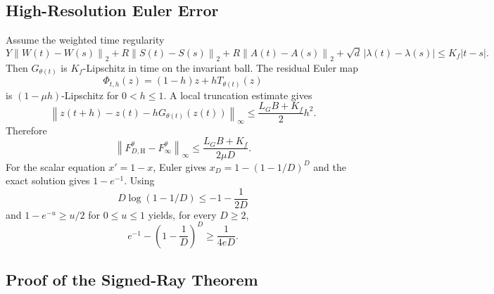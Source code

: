 \documentclass[twoside,11pt]{article}
\newcommand{\norm}[1]{\left\lVert #1\right\rVert}
\begin{document}
\subsection{High-Resolution Euler Error}
\label{soft:app:euler}

Assume the weighted time regularity
\begin{equation}
  Y\norm{W(t)-W(s)}_2+R\norm{S(t)-S(s)}_2+R\norm{A(t)-A(s)}_2+
  \sqrt d\,|\lambda(t)-\lambda(s)|\le K_f|t-s|.
  \label{soft:eq:time-reg}
\end{equation}
Then $G_{\theta(t)}$ is $K_f$-Lipschitz in time on the invariant ball.  The residual Euler map
\[
  \Phi_{t,h}(z)=(1-h)z+hT_{\theta(t)}(z)
\]
is $(1-\mu h)$-Lipschitz for $0<h\le1$.  A local truncation estimate gives
\[
  \norm{z(t+h)-z(t)-hG_{\theta(t)}(z(t))}_\infty
  \le\frac{L_GB+K_f}{2}h^2.
\]
Therefore
\begin{equation}
  \norm{F_{D,\mathrm H}^\theta-F_\infty^\theta}_\infty
  \le \frac{L_GB+K_f}{2\mu D}.
  \label{soft:eq:euler-upper}
\end{equation}
For the scalar equation $x'=1-x$, Euler gives $x_D=1-(1-1/D)^D$ and the exact solution gives $1-e^{-1}$.  Using
\[
  D\log(1-1/D)\le -1-\frac{1}{2D}
\]
and $1-e^{-u}\ge u/2$ for $0\le u\le1$ yields, for every $D\ge2$,
\begin{equation}
  e^{-1}-\left(1-\frac1D\right)^D
  \ge \frac{1}{4eD}.
  \label{soft:eq:euler-lower}
\end{equation}

\subsection{Proof of the Signed-Ray Theorem}
\label{soft:app:signed-ray}
\end{document}
